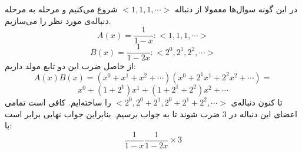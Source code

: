 \p
در این گونه سوال‌ها معمولا از دنباله
$< 1, 1, 1, \cdots >$
شروع می‌کنیم و مرحله به مرحله دنباله‌ی مورد نظر را می‌سازیم.
$$A(x) = \frac{1}{1-x}: < 1, 1, 1, \cdots >$$
$$B(x) = \frac{1}{1-2x}: < 2^0, 2^1, 2^2, \cdots >$$
از حاصل ضرب این دو تابع مولد داریم:
$$A(x)B(x) = (x^0 + x^1 + x^2 + \cdots)(x^0 + 2^1x^1 + 2^2x^2 + \cdots)=$$
$$x^0 + (1 + 2^1)x^1 + (1 + 2^1 + 2^2)x^2 + \cdots$$
تا کنون دنباله‌ی
$< 2^0, 2^0 + 2^1, 2^0 + 2^1 + 2^2, \cdots >$
را ساخته‌ایم. کافی است تمامی اعضای این دنباله در
$3$
ضرب شوند تا به جواب برسیم. بنابراین جواب نهایی برابر است با:
$$\frac{1}{1-x}\frac{1}{1-2x}\times3$$